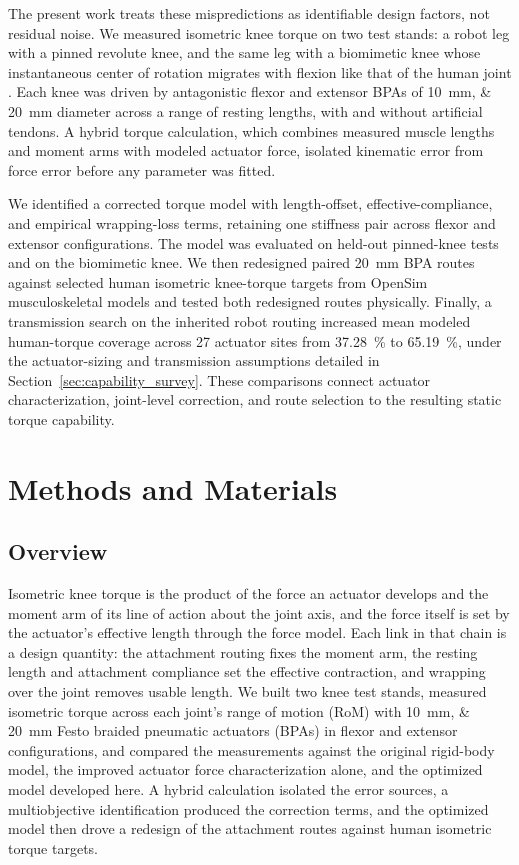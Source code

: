 \documentclass[utf8]{FrontiersinHarvard} %
\begin{document}
The present work treats these mispredictions as identifiable design factors, not residual noise. We measured isometric knee torque on two test stands: a robot leg with a pinned revolute knee, and the same leg with a biomimetic knee whose instantaneous center of rotation migrates with flexion like that of the human joint \citep{steele_biomimetic_2018, steele_development_2017}. Each knee was driven by antagonistic flexor and extensor BPAs of \qtylist{10;20}{\mm} diameter across a range of resting lengths, with and without artificial tendons. A hybrid torque calculation, which combines measured muscle lengths and moment arms with modeled actuator force, isolated kinematic error from force error before any parameter was fitted.

We identified a corrected torque model with length-offset, effective-compliance, and empirical wrapping-loss terms, retaining one stiffness pair across flexor and extensor configurations. The model was evaluated on held-out pinned-knee tests and on the biomimetic knee. We then redesigned paired \qty{20}{\mm} BPA routes against selected human isometric knee-torque targets from OpenSim musculoskeletal models \citep{seth_opensim_2018, delp_interactive_1990} and tested both redesigned routes physically. Finally, a transmission search on the inherited robot routing increased mean modeled human-torque coverage across 27 actuator sites from \qty{37.28}{\percent} to \qty{65.19}{\percent}, under the actuator-sizing and transmission assumptions detailed in Section~\ref{sec:capability_survey}. These comparisons connect actuator characterization, joint-level correction, and route selection to the resulting static torque capability.


\section{Methods and Materials}\label{sec:methods}

\subsection{Overview}

Isometric knee torque is the product of the force an actuator develops and the moment arm of its line of action about the joint axis, and the force itself is set by the actuator's effective length through the force model. Each link in that chain is a design quantity: the attachment routing fixes the moment arm, the resting length and attachment compliance set the effective contraction, and wrapping over the joint removes usable length. We built two knee test stands, measured isometric torque across each joint's range of motion (RoM) with \qtylist{10;20}{\mm} Festo braided pneumatic actuators (BPAs) in flexor and extensor configurations, and compared the measurements against the original rigid-body model, the improved actuator force characterization alone, and the optimized model developed here. A hybrid calculation isolated the error sources, a multiobjective identification produced the correction terms, and the optimized model then drove a redesign of the attachment routes against human isometric torque targets.
\end{document}
